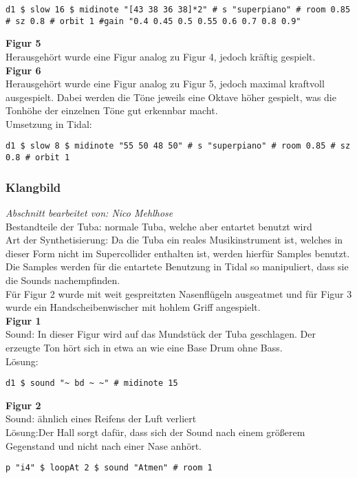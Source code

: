 \documentclass[
10pt, %
a4paper, %
oneside, %
headinclude,footinclude, %
BCOR5mm, %
]{scrartcl}
\begin{document}
\begin{lstlisting}
d1 $ slow 16 $ midinote "[43 38 36 38]*2" # s "superpiano" # room 0.85 # sz 0.8 # orbit 1 #gain "0.4 0.45 0.5 0.55 0.6 0.7 0.8 0.9"
\end{lstlisting}


\noindent\textbf{Figur 5}\\
Herausgehört wurde eine Figur analog zu Figur 4, jedoch kräftig gespielt.\\

\noindent\textbf{Figur 6}\\
Herausgehört wurde eine Figur analog zu Figur 5, jedoch maximal kraftvoll ausgespielt. Dabei werden die Töne jeweils eine Oktave höher gespielt, was die Tonhöhe der einzelnen Töne gut erkennbar macht.\\

\noindent Umsetzung in Tidal:
\begin{lstlisting}
d1 $ slow 8 $ midinote "55 50 48 50" # s "superpiano" # room 0.85 # sz 0.8 # orbit 1
\end{lstlisting}

\subsubsection{Klangbild}
\textit{Abschnitt bearbeitet von: Nico Mehlhose}\\
\noindent Bestandteile der Tuba: normale Tuba, welche aber entartet benutzt wird\\
Art der Synthetisierung: Da die Tuba ein reales Musikinstrument ist, welches in dieser Form nicht im Supercollider enthalten ist,
werden hierfür Samples benutzt. Die Samples werden für die entartete Benutzung in Tidal so manipuliert, dass sie die Sounds
nachempfinden.\\
Für Figur 2 wurde mit weit gespreitzten Nasenflügeln ausgeatmet und für Figur 3 wurde ein Handscheibenwischer mit hohlem Griff angespielt.\\

\noindent\textbf{Figur 1}\\
 Sound: In dieser Figur wird auf das Mundstück der Tuba geschlagen. Der erzeugte Ton hört sich in etwa an wie eine Base Drum ohne Bass.\\
Lösung:\\
\begin{lstlisting}
d1 $ sound "~ bd ~ ~" # midinote 15
\end{lstlisting}

\noindent\textbf{Figur 2}\\
Sound: ähnlich eines Reifens der Luft verliert\\
Lösung:Der Hall sorgt dafür, dass sich der Sound nach einem größerem Gegenstand und nicht nach einer Nase anhört.\\
\begin{lstlisting}
p "i4" $ loopAt 2 $ sound "Atmen" # room 1
\end{lstlisting}
\end{document}
